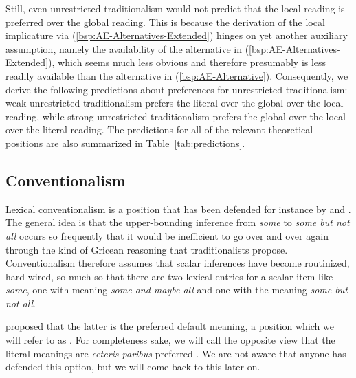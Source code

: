 \documentclass[fleqn,reqno,10pt,draft]{article}
\begin{document}
Still, even unrestricted traditionalism would not predict that the
local reading is preferred over the global reading. This is because
the derivation of the local implicature via
(\ref{bsp:AE-Alternatives-Extended}) hinges on yet another auxiliary
assumption, namely the availability of the alternative in
(\ref{bsp:AE-Alternatives-Extended}), which seems much less obvious
and therefore presumably is less readily available than the
alternative in (\ref{bsp:AE-Alternative}). Consequently, we derive the
following predictions about preferences for unrestricted
traditionalism: weak unrestricted traditionalism prefers the literal
over the global over the local reading, while strong unrestricted
traditionalism prefers the global over the local over the literal
reading. The predictions for all of the relevant theoretical positions
are also summarized in Table~\ref{tab:predictions}.


\subsection{Conventionalism}
\label{sec:conventionalism}

Lexical conventionalism is a position that has been defended for
instance by \citet{LevinsonPresumptiveMeanings2000} and
\citet{Chierchia:2004_ScalarImplicatures}. The general idea is that
the upper-bounding inference from \emph{some} to \emph{some but not
  all} occurs so frequently that it would be inefficient to go over
and over again through the kind of Gricean reasoning that
traditionalists propose. Conventionalism therefore assumes that scalar
inferences have become routinized, hard-wired, so much so that there
are two lexical entries for a scalar item like \emph{some}, one with
meaning \emph{some and maybe all} and one with the meaning \emph{some
  but not all}.

\citet{LevinsonPresumptiveMeanings2000} proposed that the latter is
the preferred default meaning, a position which we will refer to as
. For completeness sake, we will call the opposite view that
the literal meanings are \emph{ceteris paribus} preferred
. We are not aware that anyone has
defended this option, but we will come back to this later on.
\end{document}
